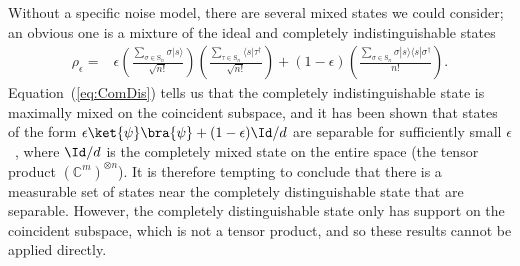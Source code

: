 Without a specific noise model, there are several mixed states we could consider; an obvious one is a mixture of the ideal and completely indistinguishable states
\begin{align}
\label{eq:Werner}
\rho_\epsilon 
=& \epsilon\left(\frac{\sum_{\sigma \in  \textrm{S}_n}\sigma|s\rangle}{\sqrt{n!}}\right)\left(\frac{\sum_{\tau \in  \textrm{S}_n}\langle s|\tau^\dagger}{\sqrt{n!}}\right) + (1-\epsilon)\left(\frac{\sum_{\sigma \in  \textrm{S}_n}\sigma|s\rangle\langle s|\sigma^\dagger}{{n!}}\right).
\end{align}
Equation~(\ref{eq:ComDis}) tells us that the completely indistinguishable state is maximally mixed on the coincident subspace, and it has been shown that states of the form $\epsilon\ket{\psi}\bra{\psi} + (1-\epsilon)\Id/d$ are separable for sufficiently small $\epsilon$~\cite{braunstein1999, rungta2001}, where $\Id/d$ is the completely mixed state on the entire space (the tensor product $(\mathbb{C}^m)^{\otimes n}$).
It is therefore tempting to conclude that there is a measurable set of states near the completely distinguishable state that are separable.
However, the completely distinguishable state only has support on the coincident subspace, which is not a tensor product, and so these results cannot be applied directly.

